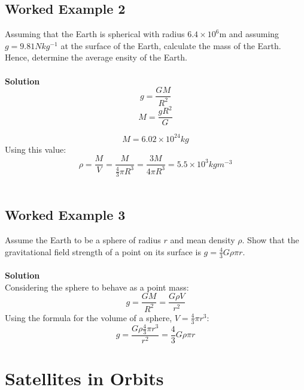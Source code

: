\documentclass{article}
\begin{document}
\subsection*{Worked Example 2}
Assuming that the Earth is spherical with radius $6.4\times10^6$m and assuming $g=9.81Nkg^{-1}$ at the surface of the Earth, calculate the mass of the Earth. Hence, determine the average ensity of the Earth.
\\
\\\textbf{Solution}
\begin{equation}
    g=\frac{GM}{R^2}
\end{equation}
\begin{equation}
    M=\frac{gR^2}{G}
\end{equation}

\begin{equation}
    M=6.02\times10^{24}kg
\end{equation}
Using this value:
\begin{equation}
    \rho=\frac{M}{V}=\frac{M}{\frac{4}{3}\pi R^3}=\frac{3M}{4\pi R^3}=5.5\times10^3kgm^{-3}
\end{equation}
\\
\subsection*{Worked Example 3}
Assume the Earth to be a sphere of radius $r$ and mean density $\rho$. Show that the gravitational field strength of a point on its surface is $g=\frac{4}{3}G\rho\pi r$.
\\
\\\textbf{Solution}
\\Considering the sphere to behave as a point mass:
\begin{equation}
    g=\frac{GM}{R^2}=\frac{G\rho V}{r^2}
\end{equation}
Using the formula for the volume of a sphere, $V=\frac{4}{3}\pi r^3$:
\begin{equation}
    g=\frac{G\rho\frac{4}{3}\pi r^3}{r^2}=\frac{4}{3}G\rho\pi r
\end{equation}
\pagebreak
\section{Satellites in Orbits}
\end{document}
